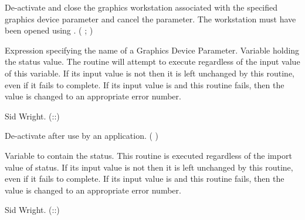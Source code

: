 \begin{manroutinedescription}
     De-activate and close the graphics workstation associated with
     the specified graphics device parameter and cancel the parameter.
     The workstation must have been opened using {}.
     {} {} ( {}; {} )
\begin{manparametertable}

           Expression specifying the name of a Graphics Device
           Parameter.
           Variable holding the status value.
           The routine will attempt to execute regardless of the input
           value of this variable.
           If its input value is not {} then it is left %
unchanged
           by this routine, even if it fails to complete.   If its
           input value is {} and this routine fails, then the
           value is changed to an appropriate error number.
\end{manparametertable}
     Sid Wright.  ({}::{})
\end{manroutinedescription}
\begin{manroutinedescription}
     De-activate {} {} after use by an application.
     {} {} ( {} )
\begin{manparametertable}
           Variable to contain the status. This routine is executed
           regardless of the import value of status.
           If its input value is not {} then it is left %
unchanged
           by this routine, even if it fails to complete.   If its
           input value is {} and this routine fails, then the
           value is changed to an appropriate error number.
\end{manparametertable}
     Sid Wright.  ({}::{})
\end{manroutinedescription}

\manrule



